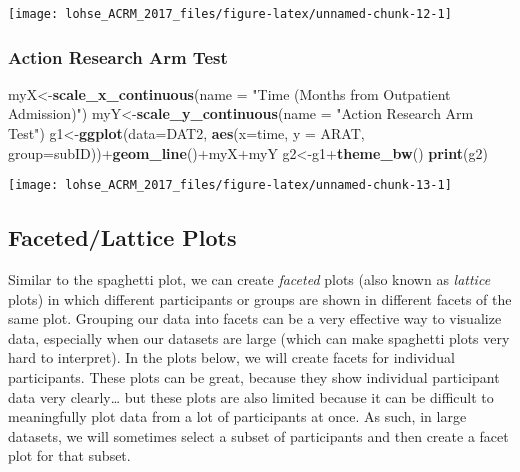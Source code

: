 \documentclass[]{article}
\newenvironment{Shaded}{\begin{snugshade}}{\end{snugshade}}
\newcommand{\KeywordTok}[1]{\textcolor[rgb]{0.13,0.29,0.53}{\textbf{{#1}}}}
\newcommand{\DataTypeTok}[1]{\textcolor[rgb]{0.13,0.29,0.53}{{#1}}}
\newcommand{\StringTok}[1]{\textcolor[rgb]{0.31,0.60,0.02}{{#1}}}
\newcommand{\NormalTok}[1]{{#1}}
\begin{document}
\begin{center}\texttt{[image: lohse\_ACRM\_2017\_files/figure-latex/unnamed-chunk-12-1]} \end{center}

\newpage

\subsubsection{Action Research Arm Test}\label{action-research-arm-test}

\begin{Shaded}
\begin{Highlighting}[]
\NormalTok{myX<-}\KeywordTok{scale_x_continuous}\NormalTok{(}\DataTypeTok{name =} \StringTok{"Time (Months from Outpatient Admission)"}\NormalTok{)}
\NormalTok{myY<-}\KeywordTok{scale_y_continuous}\NormalTok{(}\DataTypeTok{name =} \StringTok{"Action Research Arm Test"}\NormalTok{)}
\NormalTok{g1<-}\KeywordTok{ggplot}\NormalTok{(}\DataTypeTok{data=}\NormalTok{DAT2, }\KeywordTok{aes}\NormalTok{(}\DataTypeTok{x=}\NormalTok{time, }\DataTypeTok{y =} \NormalTok{ARAT, }\DataTypeTok{group=}\NormalTok{subID))+}\KeywordTok{geom_line}\NormalTok{()+myX+myY}
\NormalTok{g2<-g1+}\KeywordTok{theme_bw}\NormalTok{()}
\KeywordTok{print}\NormalTok{(g2)}
\end{Highlighting}
\end{Shaded}

\begin{center}\texttt{[image: lohse\_ACRM\_2017\_files/figure-latex/unnamed-chunk-13-1]} \end{center}

\newpage

\subsection{Faceted/Lattice Plots}\label{facetedlattice-plots}

Similar to the spaghetti plot, we can create \emph{faceted} plots (also
known as \emph{lattice} plots) in which different participants or groups
are shown in different facets of the same plot. Grouping our data into
facets can be a very effective way to visualize data, especially when
our datasets are large (which can make spaghetti plots very hard to
interpret). In the plots below, we will create facets for individual
participants. These plots can be great, because they show individual
participant data very clearly\ldots{} but these plots are also limited
because it can be difficult to meaningfully plot data from a lot of
participants at once. As such, in large datasets, we will sometimes
select a subset of participants and then create a facet plot for that
subset.
\end{document}
